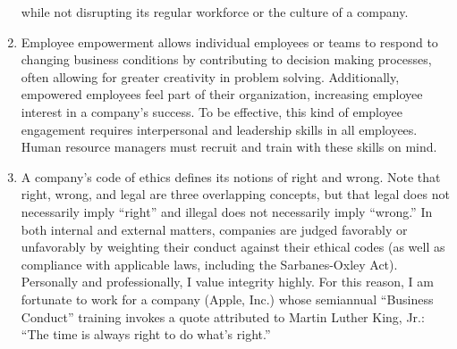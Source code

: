 \documentclass[12pt,apa,article,oneside,strict,titlepage]{eyered}
\begin{document}
\begin{enumerate}
  while not disrupting its regular workforce or the culture of a
  company.
\item
  Employee empowerment allows individual employees or teams to respond
  to changing business conditions by contributing to decision making
  processes, often allowing for greater creativity in problem solving.
  Additionally, empowered employees feel part of their organization,
  increasing employee interest in a company's success. To be effective,
  this kind of employee engagement requires interpersonal and leadership
  skills in all employees. Human resource managers must recruit and
  train with these skills on mind.
\item
  A company's code of ethics defines its notions of right and wrong.
  Note that right, wrong, and legal are three overlapping concepts, but
  that legal does not necessarily imply ``right'' and illegal does not
  necessarily imply ``wrong.'' In both internal and external matters,
  companies are judged favorably or unfavorably by weighting their
  conduct against their ethical codes (as well as compliance with
  applicable laws, including the Sarbanes-Oxley Act). Personally and
  professionally, I value integrity highly. For this reason, I am
  fortunate to work for a company (Apple, Inc.) whose semiannual
  ``Business Conduct'' training invokes a quote attributed to Martin
  Luther King, Jr.: ``The time is always right to do what's right.''
\end{enumerate}

\clearpage
\setpagenotes
\clearpage
\setreferences %

\end{document}
